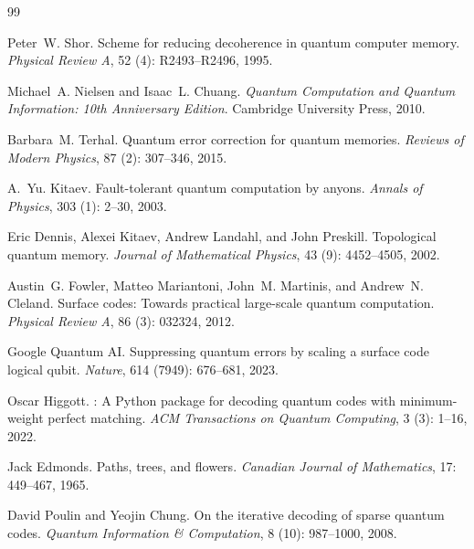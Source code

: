 \documentclass[reprint,aps,prxquantum,amsmath,amssymb,floatfix,nofootinbib,longbibliography]{revtex4-2}
\theoremstyle{definition}
\theoremstyle{remark}
\theoremstyle{plain}
\begin{document}
\begin{thebibliography}{99}

Peter~W. Shor.
\newblock Scheme for reducing decoherence in quantum computer memory.
\newblock \emph{Physical Review A}, 52 (4): R2493--R2496,
  1995.

Michael~A. Nielsen and Isaac~L. Chuang.
\newblock \emph{Quantum Computation and Quantum Information: 10th Anniversary
  Edition}.
\newblock Cambridge University Press, 2010.

Barbara~M. Terhal.
\newblock Quantum error correction for quantum memories.
\newblock \emph{Reviews of Modern Physics}, 87 (2): 307--346,
  2015.

A.~Yu. Kitaev.
\newblock Fault-tolerant quantum computation by anyons.
\newblock \emph{Annals of Physics}, 303 (1): 2--30, 2003.

Eric Dennis, Alexei Kitaev, Andrew Landahl, and John Preskill.
\newblock Topological quantum memory.
\newblock \emph{Journal of Mathematical Physics}, 43 (9):
  4452--4505, 2002.

Austin~G. Fowler, Matteo Mariantoni, John~M. Martinis, and Andrew~N. Cleland.
\newblock Surface codes: Towards practical large-scale quantum computation.
\newblock \emph{Physical Review A}, 86 (3): 032324, 2012.

{Google Quantum AI}.
\newblock Suppressing quantum errors by scaling a surface code logical qubit.
\newblock \emph{Nature}, 614 (7949): 676--681, 2023.

Oscar Higgott.
: A {Python} package for decoding quantum codes with
  minimum-weight perfect matching.
\newblock \emph{ACM Transactions on Quantum Computing}, 3
  (3): 1--16, 2022.

Jack Edmonds.
\newblock Paths, trees, and flowers.
\newblock \emph{Canadian Journal of Mathematics}, 17: 449--467, 1965.

David Poulin and Yeojin Chung.
\newblock On the iterative decoding of sparse quantum codes.
\newblock \emph{Quantum Information \& Computation}, 8 (10):
  987--1000, 2008.


\end{thebibliography}
\end{document}

